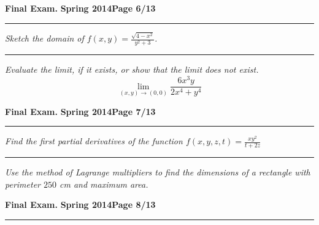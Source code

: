 \documentclass[12pt]{article}
\begin{document}
\newpage

\hfill{\large\bf Final Exam.}\hfill{\large\bf
  Spring 2014}\hfill{\large\bf Page 6/13}\hrule

\bigskip
{\problem[15 pts] \em  Sketch the domain of $f(x,y)=\displaystyle{\frac{\sqrt{4-x^2}}{y^2+3}}$.}
\vspace{11.5cm}
\hrule
{\problem[15 pts] \em Evaluate the limit, if it exists, or show that the limit does not exist.}
\begin{equation*}
\lim_{(x,y) \to (0,0)} \frac{ 6x^3 y}{ 2x^4 + y^4}
\end{equation*}
\vspace{6.5cm}
\begin{flushright}
\end{flushright}
\newpage

\hfill{\large\bf Final Exam.}\hfill{\large\bf
  Spring 2014}\hfill{\large\bf Page 7/13}\hrule

\bigskip
{\problem[15 pts] \em Find the first partial derivatives of the function $f(x,y,z,t) = \frac{xy^2}{t+2z}$}

\vspace{9.5cm}
\hrule
{\problem[10 pts] \em Use the method of Lagrange multipliers to find the
dimensions of a rectangle with perimeter $250$ cm and maximum area.}
\vspace{7.5cm}
\begin{flushright}
\end{flushright}
\newpage

\hfill{\large\bf Final Exam.}\hfill{\large\bf
  Spring 2014}\hfill{\large\bf Page 8/13}\hrule
\end{document}
